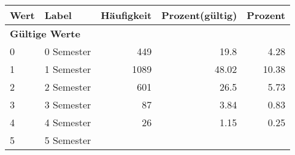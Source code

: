      \begin{longtable}{lXrrr}
     \toprule
     \textbf{Wert} & \textbf{Label} & \textbf{Häufigkeit} & \textbf{Prozent(gültig)} & \textbf{Prozent} \\
     \endhead
     \midrule
     \multicolumn{5}{l}{\textbf{Gültige Werte}}\\

     0 &
     \multicolumn{1}{X}{ 0 Semester   } &


       \num{449} &
       \num[round-mode=places,round-precision=2]{19.8} &
         \num[round-mode=places,round-precision=2]{4.28} \\

     1 &
     \multicolumn{1}{X}{ 1 Semester   } &


       \num{1089} &
       \num[round-mode=places,round-precision=2]{48.02} &
         \num[round-mode=places,round-precision=2]{10.38} \\

     2 &
     \multicolumn{1}{X}{ 2 Semester   } &


       \num{601} &
       \num[round-mode=places,round-precision=2]{26.5} &
         \num[round-mode=places,round-precision=2]{5.73} \\

     3 &
     \multicolumn{1}{X}{ 3 Semester   } &


       \num{87} &
       \num[round-mode=places,round-precision=2]{3.84} &
         \num[round-mode=places,round-precision=2]{0.83} \\

     4 &
     \multicolumn{1}{X}{ 4 Semester   } &


       \num{26} &
       \num[round-mode=places,round-precision=2]{1.15} &
         \num[round-mode=places,round-precision=2]{0.25} \\

     5 &
     \multicolumn{1}{X}{ 5 Semester   } &



\end{longtable}
